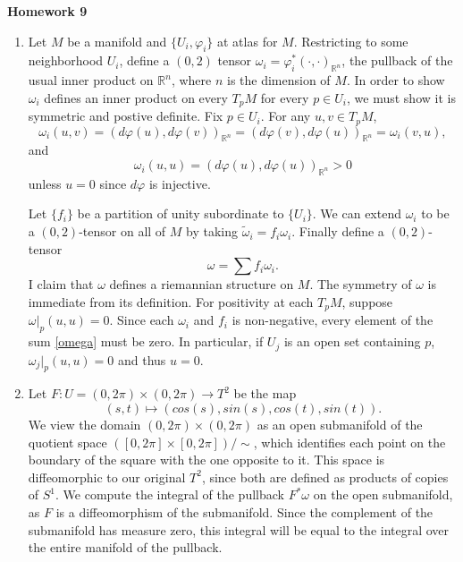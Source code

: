 \documentclass[11pt, reqno]{article}
\theoremstyle{plain}
\theoremstyle{definition}
\theoremstyle{remark}
\renewcommand{\phi}{\varphi}
\newcommand{\RR}{\mathbb{R}}
\begin{document}
\topmargin=-40pt
\renewcommand{\headrulewidth}{1pt}
\renewcommand{\headsep}{20pt}
\thispagestyle{fancy}

{\Huge \bfseries \noindent Homework 9}

\begin{enumerate}
    \item[1.] Let $M$ be a manifold and $\{U_i, \phi_i\}$ at atlas for $M$. Restricting to some neighborhood
    $U_i$, define a $(0,2)$ tensor $\omega_i = \phi_i^*(\cdot, \cdot)_{\RR^n}$, the pullback of the usual inner product 
    on $\RR^n$, where $n$ is the dimension of $M$. In order to show $\omega_i$ defines an inner product on every $T_p M$ 
    for every $p \in U_i$, we must show it is symmetric and postive definite. Fix $p \in U_i$. For any $u, v \in T_p M$, 
    \[
        \omega_i(u, v) = (d\phi(u), d\phi(v))_{\RR^n} = (d\phi(v), d\phi(u))_{\RR^n} = \omega_i(v,u),
    \]
    and 
    \[
        \omega_i(u,u) = (d\phi(u),d\phi(u))_{\RR^n} > 0
    \]
    unless $u = 0$ since $d\phi$ is injective. 

    Let $\{f_i\}$ be a partition of unity subordinate to $\{U_i\}$. We can extend $\omega_i$ to be a $(0,2)$-tensor 
    on all of $M$ by taking $\tilde{\omega}_i = f_i\omega_i$. Finally define a $(0,2)$-tensor 
    \begin{equation}\label{omega}
        \omega = \sum f_i \omega_i.
    \end{equation}
    I claim that $\omega$ defines a riemannian structure on $M$. The symmetry of $\omega$ is immediate from its definition.
    For positivity at each $T_p M$, suppose $\omega|_p(u,u) = 0$. Since each $\omega_i$ and $f_i$ is non-negative,
    every element of the sum \ref{omega} must be zero. In particular, if $U_j$ is an open set containing $p$,
    $\omega_j|_p(u,u) = 0$ and thus $u = 0$. 
    
    \item[2.] Let $F: U = \left(0,2\pi\right)\times \left(0,2\pi\right) \to T^2$ be the map 
    \[
        (s,t) \mapsto (cos(s), sin(s), cos(t), sin(t)).
    \]
    We view the domain $(0,2\pi)\times(0,2\pi)$ as an open submanifold of the quotient space 
    $\left([0,2\pi]\times[0,2\pi]\right)/\sim$, 
    which identifies each point on the boundary of the square with the one opposite to it. This space
    is diffeomorphic to our original $T^2$, since both are defined as products of copies of $S^1$. We compute
    the integral of the pullback $F^*\omega$ on the open submanifold, as $F$ is a diffeomorphism of the submanifold.
    Since the complement of the submanifold has measure zero, this integral will be equal to the integral
    over the entire manifold of the pullback. 


\end{enumerate}
\end{document}
